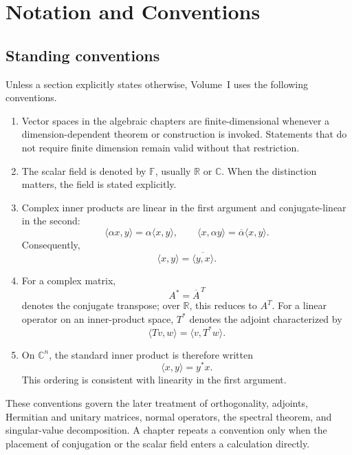 \chapter*{Notation and Conventions}
\label{sec:i-notation-and-conventions}

\section*{Standing conventions}

Unless a section explicitly states otherwise, Volume~I uses the following
conventions.

\begin{enumerate}
\item Vector spaces in the algebraic chapters are finite-dimensional whenever
a dimension-dependent theorem or construction is invoked. Statements that do
not require finite dimension remain valid without that restriction.

\item The scalar field is denoted by \(\mathbb F\), usually
\(\mathbb R\) or \(\mathbb C\). When the distinction matters, the field is
stated explicitly.

\item Complex inner products are linear in the first argument and
conjugate-linear in the second:
\[
\langle \alpha x,y\rangle
 = \alpha\langle x,y\rangle,
\qquad
\langle x,\alpha y\rangle
 = \overline{\alpha}\langle x,y\rangle.
\]
Consequently,
\[
\langle x,y\rangle=\overline{\langle y,x\rangle}.
\]

\item For a complex matrix,
\[
A^*=\overline A^{\,T}
\]
denotes the conjugate transpose; over \(\mathbb R\), this reduces to
\(A^T\). For a linear operator on an inner-product space, \(T^*\) denotes
the adjoint characterized by
\[
\langle Tv,w\rangle=\langle v,T^*w\rangle.
\]

\item On \(\mathbb C^n\), the standard inner product is therefore written
\[
\langle x,y\rangle=y^*x.
\]
This ordering is consistent with linearity in the first argument.
\end{enumerate}

These conventions govern the later treatment of orthogonality, adjoints,
Hermitian and unitary matrices, normal operators, the spectral theorem, and
singular-value decomposition. A chapter repeats a convention only when the
placement of conjugation or the scalar field enters a calculation directly.
